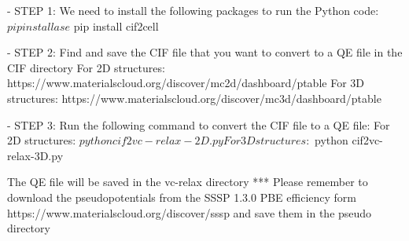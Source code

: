 - STEP 1: We need to install the following packages to run the Python code:
$ pip install ase
$ pip install cif2cell

- STEP 2: Find and save the CIF file that you want to convert to a QE file in the CIF directory
For 2D structures: https://www.materialscloud.org/discover/mc2d/dashboard/ptable
For 3D structures: https://www.materialscloud.org/discover/mc3d/dashboard/ptable

- STEP 3: Run the following command to convert the CIF file to a QE file:
For 2D structures:
$ python cif2vc-relax-2D.py
For 3D structures:
$ python cif2vc-relax-3D.py 

The QE file will be saved in the vc-relax directory
*** Please remember to download the pseudopotentials from the SSSP 1.3.0 PBE efficiency form https://www.materialscloud.org/discover/sssp and save them in the pseudo directory